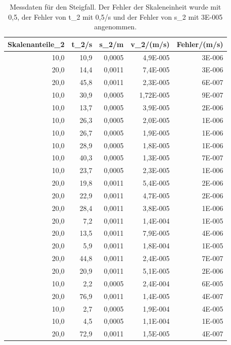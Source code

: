 \documentclass[12pt]{scrartcl}
\begin{document}
\begin{table}[H]
\caption{Messdaten für den Steigfall. Der Fehler der Skaleneinheit wurde mit 0,5, der Fehler von t\_2 mit 0,5/s und der Fehler von s\_2 mit  3E-005 angenommen.}
\begin{center}
\begin{tabular}{|r|r|r|r|r|}
\hline
\multicolumn{1}{|l|}{Skalenanteile\_2} & \multicolumn{1}{l|}{t\_2/s} & \multicolumn{1}{l|}{s\_2/m} & \multicolumn{1}{l|}{v\_2/(m/s)} & \multicolumn{1}{l|}{Fehler/(m/s)} \\ \hline
10,0 & 10,9 & 0,0005 & 4,9E-005 & 3E-006 \\ \hline
20,0 & 14,4 & 0,0011 & 7,4E-005 & 3E-006 \\ \hline
20,0 & 45,8 & 0,0011 & 2,3E-005 & 6E-007 \\ \hline
10,0 & 30,9 & 0,0005 & 1,72E-005 & 9E-007 \\ \hline
10,0 & 13,7 & 0,0005 & 3,9E-005 & 2E-006 \\ \hline
10,0 & 26,3 & 0,0005 & 2,0E-005 & 1E-006 \\ \hline
10,0 & 26,7 & 0,0005 & 1,9E-005 & 1E-006 \\ \hline
10,0 & 28,9 & 0,0005 & 1,8E-005 & 1E-006 \\ \hline
10,0 & 40,3 & 0,0005 & 1,3E-005 & 7E-007 \\ \hline
10,0 & 23,7 & 0,0005 & 2,3E-005 & 1E-006 \\ \hline
20,0 & 19,8 & 0,0011 & 5,4E-005 & 2E-006 \\ \hline
20,0 & 22,9 & 0,0011 & 4,7E-005 & 2E-006 \\ \hline
20,0 & 28,4 & 0,0011 & 3,8E-005 & 1E-006 \\ \hline
20,0 & 7,2 & 0,0011 & 1,4E-004 & 1E-005 \\ \hline
20,0 & 13,5 & 0,0011 & 7,9E-005 & 4E-006 \\ \hline
20,0 & 5,9 & 0,0011 & 1,8E-004 & 1E-005 \\ \hline
20,0 & 44,8 & 0,0011 & 2,4E-005 & 7E-007 \\ \hline
20,0 & 20,9 & 0,0011 & 5,1E-005 & 2E-006 \\ \hline
10,0 & 2,2 & 0,0005 & 2,4E-004 & 6E-005 \\ \hline
20,0 & 76,9 & 0,0011 & 1,4E-005 & 4E-007 \\ \hline
10,0 & 2,7 & 0,0005 & 1,9E-004 & 4E-005 \\ \hline
10,0 & 4,5 & 0,0005 & 1,1E-004 & 1E-005 \\ \hline
20,0 & 72,9 & 0,0011 & 1,5E-005 & 4E-007 \\ \hline

\end{tabular}
\end{center}
\end{table}
\end{document}
